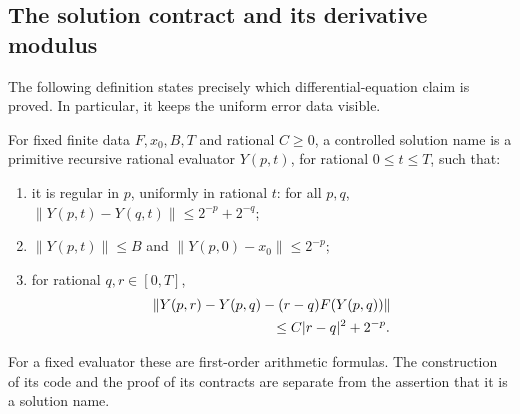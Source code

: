 \subsection{The solution contract and its derivative modulus}

The following definition states precisely which differential-equation
claim is proved.  In particular, it keeps the uniform error data visible.

\begin{definition}
\label{def:controlled-flow}
For fixed finite data $F,x_0,B,T$ and rational $C\ge0$, a controlled
solution name is a primitive recursive rational evaluator $Y(p,t)$,
for rational $0\le t\le T$, such that:
\begin{enumerate}
\item it is regular in $p$, uniformly in rational $t$: for all $p,q$,
      $\lVert Y(p,t)-Y(q,t)\rVert\le2^{-p}+2^{-q}$;
\item $\lVert Y(p,t)\rVert\le B$ and
      $\lVert Y(p,0)-x_0\rVert\le2^{-p}$;
\item for rational $q,r\in[0,T]$,
\begin{equation}
 \begin{split}
 &\lVert Y(p,r)-Y(p,q)-(r-q)F(Y(p,q))\rVert\\
 &\hspace{30mm}\le C|r-q|^2+2^{-p}.
 \end{split}
 \label{eq:ode-controlled}
\end{equation}
\end{enumerate}
For a fixed evaluator these are first-order arithmetic formulas.
The construction of its code and the proof of its contracts are separate
from the assertion that it is a solution name.
\end{definition}

